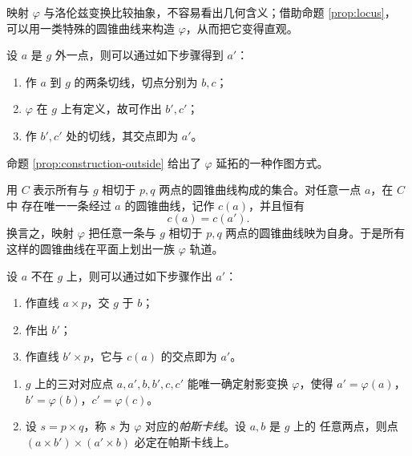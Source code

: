 映射 $\varphi$ 与洛伦兹变换比较抽象，不容易看出几何含义；借助命题 \ref{prop:locus}，
可以用一类特殊的圆锥曲线来构造 $\varphi$，从而把它变得直观。

\begin{proposition}\label{prop:construction-outside}
设 $a$ 是 $g$ 外一点，则可以通过如下步骤得到 $a'$：
\begin{enumerate}[label=(\arabic*),leftmargin=2.4em]
\item 作 $a$ 到 $g$ 的两条切线，切点分别为 $b,c$；
\item $\varphi$ 在 $g$ 上有定义，故可作出 $b',c'$；
\item 作 $b',c'$ 处的切线，其交点即为 $a'$。
\end{enumerate}
\end{proposition}

命题 \ref{prop:construction-outside} 给出了 $\varphi$ 延拓的一种作图方式。

\begin{proposition}\label{prop:family}
用 $C$ 表示所有与 $g$ 相切于 $p,q$ 两点的圆锥曲线构成的集合。对任意一点 $a$，在 $C$ 中
存在唯一一条经过 $a$ 的圆锥曲线，记作 $c(a)$，并且恒有
\[
c(a)=c(a') .
\]
换言之，映射 $\varphi$ 把任意一条与 $g$ 相切于 $p,q$ 两点的圆锥曲线映为自身。于是所有
这样的圆锥曲线在平面上划出一族 $\varphi$ 轨道。
\end{proposition}

\begin{proposition}\label{prop:construction-inside}
设 $a$ 不在 $g$ 上，则可以通过如下步骤作出 $a'$：
\begin{enumerate}[label=(\arabic*),leftmargin=2.4em]
\item 作直线 $a\times p$，交 $g$ 于 $b$；
\item 作出 $b'$；
\item 作直线 $b'\times p$，它与 $c(a)$ 的交点即为 $a'$。
\end{enumerate}
\end{proposition}

\begin{proposition}[帕斯卡定理]\label{prop:pascal}
\begin{enumerate}[label=(\arabic*),leftmargin=2.4em]
\item $g$ 上的三对对应点 $a,a',b,b',c,c'$ 能唯一确定射影变换 $\varphi$，使得
      $a'=\varphi(a)$，$b'=\varphi(b)$，$c'=\varphi(c)$。
\item 设 $s=p\times q$，称 $s$ 为 $\varphi$ 对应的\emph{帕斯卡线}。设 $a,b$ 是 $g$ 上的
      任意两点，则点 $(a\times b')\times(a'\times b)$ 必定在帕斯卡线上。
\end{enumerate}
\end{proposition}

